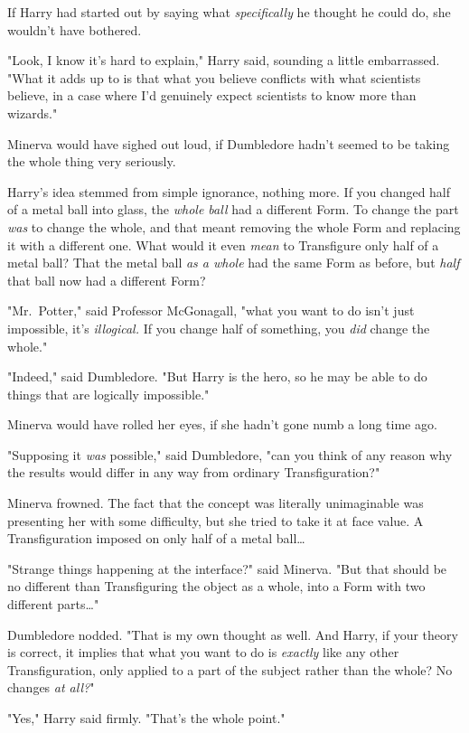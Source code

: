 If Harry had started out by saying what \emph{specifically} he thought he could
do, she wouldn't have bothered.

"Look, I know it's hard to explain," Harry said, sounding a little embarrassed.
"What it adds up to is that what you believe conflicts with what scientists
believe, in a case where I'd genuinely expect scientists to know more than
wizards."

Minerva would have sighed out loud, if Dumbledore hadn't seemed to be taking
the whole thing very seriously.

Harry's idea stemmed from simple ignorance, nothing more. If you changed half
of a metal ball into glass, the \emph{whole ball} had a different Form. To
change the part \emph{was} to change the whole, and that meant removing the
whole Form and replacing it with a different one. What would it even
\emph{mean} to Transfigure only half of a metal ball? That the metal ball
\emph{as a whole} had the same Form as before, but \emph{half} that ball now
had a different Form?

"Mr.~Potter," said Professor McGonagall, "what you want to do isn't just
impossible, it's \emph{illogical.} If you change half of something, you
\emph{did} change the whole."

"Indeed," said Dumbledore. "But Harry is the hero, so he may be able to do
things that are logically impossible."

Minerva would have rolled her eyes, if she hadn't gone numb a long time ago.

"Supposing it \emph{was} possible," said Dumbledore, "can you think of any
reason why the results would differ in any way from ordinary Transfiguration?"

Minerva frowned. The fact that the concept was literally unimaginable was
presenting her with some difficulty, but she tried to take it at face value. A
Transfiguration imposed on only half of a metal ball{\ldots}

"Strange things happening at the interface?" said Minerva. "But that should be
no different than Transfiguring the object as a whole, into a Form with two
different parts{\ldots}"

Dumbledore nodded. "That is my own thought as well. And Harry, if your theory
is correct, it implies that what you want to do is \emph{exactly} like any
other Transfiguration, only applied to a part of the subject rather than the
whole? No changes \emph{at all?}"

"Yes," Harry said firmly. "That's the whole point."

